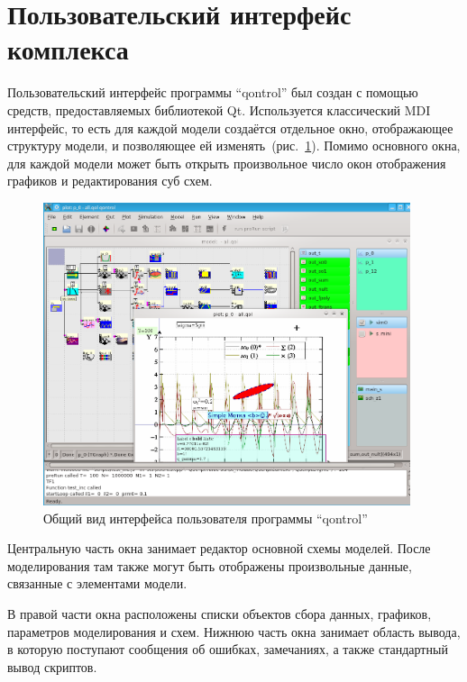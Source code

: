 




\section{Пользовательский интерфейс комплекса} %

Пользовательский интерфейс программы ``qontrol'' был создан с помощью
средств, предоставляемых библиотекой Qt.
Используется классический MDI интерфейс,
то есть для каждой модели создаётся отдельное окно,
отображающее структуру модели, и позволяющее ей изменять~(рис.~\ref{atu:f:qontrol_all}).
Помимо основного окна, для каждой модели может быть открыть
произвольное число окон отображения графиков и редактирования суб схем.


\begin{figure}[htb!]
  \begin{center}
    \includegraphics[width=0.96\textwidth]{p/qontrol_all.png}
  \end{center}
  \caption{Общий вид интерфейса пользователя программы ``qontrol''}
  \label{atu:f:qontrol_all}
\end{figure}

Центральную часть окна занимает редактор основной схемы моделей.
После моделирования там также могут быть отображены
произвольные данные, связанные с элементами модели.

В правой части окна расположены списки объектов сбора данных,
графиков, параметров моделирования и схем.
Нижнюю часть окна занимает область вывода,
в которую поступают сообщения об ошибках, замечаниях,
а также стандартный вывод скриптов.


